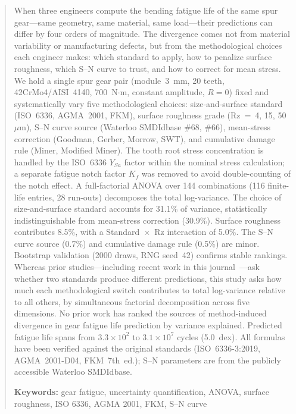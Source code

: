 \documentclass[12pt,a4paper]{article}
\begin{document}
\begin{abstract}
\label{sec:abstract}

When three engineers compute the bending fatigue life of the same spur
gear---same geometry, same material, same load---their predictions can
differ by four orders of magnitude. The divergence comes not from
material variability or manufacturing defects, but from the
methodological choices each engineer makes: which standard to apply, how
to penalize surface roughness, which S--N curve to trust, and how to
correct for mean stress. We hold a single spur gear pair
(module~3~mm, 20 teeth, 42CrMo4/AISI~4140, 700~N$\cdot$m, constant
amplitude, $R=0$) fixed and systematically vary five methodological
choices: size-and-surface standard (ISO~6336, AGMA~2001, FKM), surface
roughness grade (Rz~=~4, 15, 50~$\mu$m), S--N curve source (Waterloo
SMDIdbase \#68, \#66), mean-stress correction (Goodman, Gerber, Morrow,
SWT), and cumulative damage rule (Miner, Modified Miner). The tooth
root stress concentration is handled by the ISO~6336 $Y_{Sa}$ factor
within the nominal stress calculation; a separate fatigue notch factor
$K_f$ was removed to avoid double-counting of the notch effect. A
full-factorial ANOVA over 144 combinations (116 finite-life entries,
28 run-outs) decomposes the total log-variance. The choice of
size-and-surface standard accounts for 31.1\% of variance, statistically
indistinguishable from mean-stress correction (30.9\%). Surface
roughness contributes 8.5\%, with a Standard~$\times$~Rz interaction of
5.0\%. The S--N curve source (0.7\%) and cumulative damage rule (0.5\%)
are minor. Bootstrap validation (2000 draws, RNG seed~42) confirms
stable rankings. Whereas prior studies---including recent work in this
journal~\cite{bonaiti2024}---ask whether two standards produce different
predictions, this study asks how much each methodological switch contributes
to total log-variance relative to all others, by simultaneous factorial
decomposition across five dimensions. No prior work has ranked the
sources of method-induced divergence in gear fatigue life prediction by
variance explained. Predicted fatigue life spans from $3.3\times10^2$ to
$3.1\times10^7$ cycles (5.0~dex). All formulas have been verified
against the original standards (ISO~6336-3:2019, AGMA~2001-D04,
FKM~7th~ed.); S--N parameters are from the publicly accessible Waterloo
SMDIdbase.

\textbf{Keywords:} gear fatigue, uncertainty quantification, ANOVA,
surface roughness, ISO 6336, AGMA 2001, FKM, S--N curve
\end{abstract}
\end{document}
